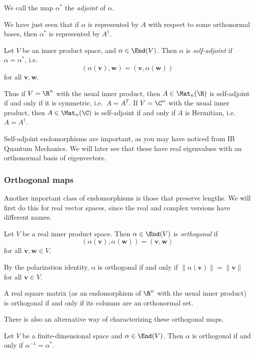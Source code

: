 \documentclass[a4paper]{article}
\begin{document}
\begin{defi}[Adjoint]
  We call the map $\alpha^*$ the \emph{adjoint} of $\alpha$.
\end{defi}
We have just seen that if $\alpha$ is represented by $A$ with respect to some orthonormal bases, then $\alpha^*$ is represented by $A^\dagger$.

\begin{defi}
  Let $V$ be an inner product space, and $\alpha \in \End(V)$. Then $\alpha$ is \emph{self-adjoint} if $\alpha = \alpha^*$, i.e.
  \[
    (\alpha(\mathbf{v}), \mathbf{w}) = (\mathbf{v}, \alpha(\mathbf{w}))
  \]
  for all $\mathbf{v}, \mathbf{w}$.
\end{defi}
Thus if $V = \R^n$ with the usual inner product, then $A \in \Mat_n(\R)$ is self-adjoint if and only if it is symmetric, i.e.\ $A = A^T$. If $V = \C^n$ with the usual inner product, then $A \in \Mat_n(\C)$ is self-adjoint if and only if $A$ is Hermitian, i.e.\ $A = A^\dagger$.

Self-adjoint endomorphisms are important, as you may have noticed from IB Quantum Mechanics. We will later see that these have real eigenvalues with an orthonormal basis of eigenvectors.

\subsubsection*{Orthogonal maps}
Another important class of endomorphisms is those that preserve lengths. We will first do this for real vector spaces, since the real and complex versions have different names.
\begin{defi}
  Let $V$ be a real inner product space. Then $\alpha \in \End(V)$ is \emph{orthogonal} if
  \[
    (\alpha(\mathbf{v}), \alpha(\mathbf{w})) = (\mathbf{v}, \mathbf{w})
  \]
  for all $\mathbf{v}, \mathbf{w} \in V$.
\end{defi}
By the polarization identity, $\alpha$ is orthogonal if and only if $\|\alpha(\mathbf{v})\| = \|\mathbf{v}\|$ for all $\mathbf{v} \in V$.

A real square matrix (as an endomorphism of $\R^n$ with the usual inner product) is orthogonal if and only if its columns are an orthonormal set.

There is also an alternative way of characterizing these orthogonal maps.

\begin{lemma}
  Let $V$ be a finite-dimensional space and $\alpha \in \End(V)$. Then $\alpha$ is orthogonal if and only if $\alpha^{-1} = \alpha^*$.
\end{lemma}
\end{document}
